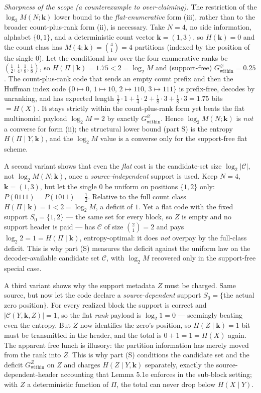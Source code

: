 \documentclass[
]{article}
\begin{document}
\emph{Sharpness of the scope (a counterexample to over-claiming).} The
restriction of the $\log_2 M(N;\mathbf{k})$ lower bound to the
\emph{flat-enumerative} form (iii), rather than to the broader
count-plus-rank form (ii), is necessary. Take $N = 4$, no side
information, alphabet $\{0,1\}$, and a deterministic count vector
$\mathbf{k} = (1,3)$, so $H(\mathbf{k}) = 0$ and the count class has
$M(4;\mathbf{k}) = \binom{4}{1} = 4$ partitions (indexed by the position
of the single $0$). Let the conditional law over the four enumerative
ranks be $(\tfrac12, \tfrac14, \tfrac18, \tfrac18)$, so
$H(\Pi \mid \mathbf{k}) = 1.75 < 2 = \log_2 M$ and (support-free)
$G_{\mathrm{within}}^{\varnothing} = 0.25$. The count-plus-rank code that
sends an empty count prefix and then the Huffman index code
$\{0 \mapsto 0,\, 1 \mapsto 10,\, 2 \mapsto 110,\, 3 \mapsto 111\}$ is
prefix-free, decodes by unranking, and has expected length
$\tfrac12\cdot1 + \tfrac14\cdot2 + \tfrac18\cdot3 + \tfrac18\cdot3 = 1.75$
bits $= H(X)$. It stays strictly within the count-plus-rank form yet
beats the flat multinomial payload $\log_2 M = 2$ by exactly
$G_{\mathrm{within}}^{\varnothing}$. Hence $\log_2 M(N;\mathbf{k})$ is
\emph{not} a converse for form (ii); the structural lower bound (part S)
is the entropy $H(\Pi \mid Y, \mathbf{k})$, and the $\log_2 M$ value is a
converse only for the support-free flat scheme.

A second variant shows that even the \emph{flat} cost is the candidate-set
size $\log_2 |\mathcal{C}|$, not $\log_2 M(N;\mathbf{k})$, once a
\emph{source-independent} support is used. Keep $N = 4$,
$\mathbf{k} = (1,3)$, but let the single $0$ be uniform on positions
$\{1,2\}$ only: $P(0111) = P(1011) = \tfrac12$. Relative to the full count
class $H(\Pi \mid \mathbf{k}) = 1 < 2 = \log_2 M$, a deficit of $1$. Yet a
flat code with the fixed support $S_0 = \{1,2\}$ --- the same set for every
block, so $Z$ is empty and no support header is paid --- has $\mathcal{C}$
of size $\binom{2}{1} = 2$ and pays $\log_2 2 = 1 = H(\Pi \mid \mathbf{k})$,
entropy-optimal: it does \emph{not} overpay by the full-class deficit.
This is why part (S) measures the deficit against the uniform law on the
decoder-available candidate set $\mathcal{C}$, with $\log_2 M$ recovered
only in the support-free special case.

A third variant shows why the support metadata $Z$ must be charged. Same
source, but now let the code declare a \emph{source-dependent} support
$S_0 = \{$the actual zero position$\}$. For every realized block the
support is correct and $|\mathcal{C}(Y, \mathbf{k}, Z)| = 1$, so the flat
\emph{rank} payload is $\log_2 1 = 0$ --- seemingly beating even the
entropy. But $Z$ now identifies the zero's position, so
$H(Z \mid \mathbf{k}) = 1$ bit must be transmitted in the header, and the
total is $0 + 1 = 1 = H(X)$ again. The apparent free lunch is illusory:
the partition information has merely moved from the rank into $Z$. This is
why part (S) conditions the candidate set and the deficit
$G_{\mathrm{within}}^{Z}$ on $Z$ and charges $H(Z \mid Y, \mathbf{k})$
separately, exactly the source-dependent-header accounting that Lemma
5.1e enforces in the sub-block setting; with $Z$ a deterministic function
of $\Pi$, the total can never drop below $H(X \mid Y)$.
\end{document}
